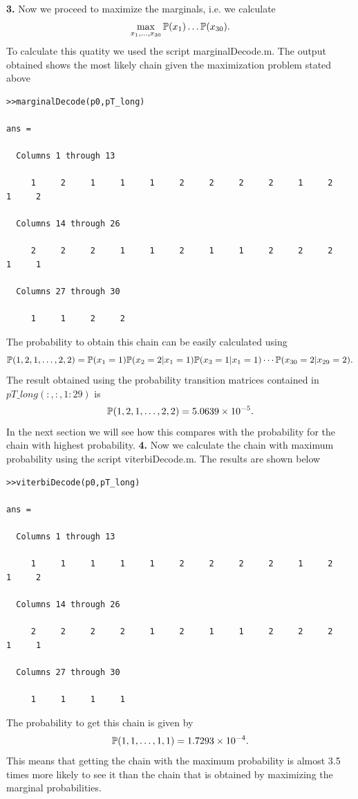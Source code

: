 \documentclass{article}
\begin{document}
\textbf{3.}
\newline
Now we proceed to maximize the marginals, i.e. we calculate
\begin{equation*}
\max_{x_{1},\ldots,x_{30}}\mathbb{P}(x_{1})\ldots\mathbb{P}(x_{30}).
\end{equation*} 
To calculate this quatity we used the script marginalDecode.m. The output obtained shows the most likely chain given the maximization problem stated above
\begin{verbatim}
>>marginalDecode(p0,pT_long)

ans =

  Columns 1 through 13

     1     2     1     1     1     2     2     2     2     1     2     1     2

  Columns 14 through 26

     2     2     2     1     1     2     1     1     2     2     2     1     1

  Columns 27 through 30

     1     1     2     2
\end{verbatim}
The probability to obtain this chain can be easily calculated using 
\begin{equation*}
\mathbb{P}(1,2,1,\ldots,2,2)=\mathbb{P}(x_{1}=1)\mathbb{P}(x_{2}=2|x_{1}=1)\mathbb{P}(x_{3}=1|x_{1}=1)\cdots\mathbb{P}(x_{30}=2|x_{29}=2).
\end{equation*}
The result obtained using the probability transition matrices contained in $pT\_long(:,:,1:29)$ is
\begin{equation*}
\mathbb{P}(1,2,1,\ldots,2,2)=5.0639\times 10^{-5}.
\end{equation*}
In the next section we will see how this compares with the probability for the chain with highest probability.
\newline
\textbf{4.}
\newline
Now we calculate the chain with maximum probability using the script viterbiDecode.m. The results are shown below

\begin{verbatim}
>>viterbiDecode(p0,pT_long)  

ans =

  Columns 1 through 13

     1     1     1     1     1     2     2     2     2     1     2     1     2

  Columns 14 through 26

     2     2     2     2     1     2     1     1     2     2     2     1     1

  Columns 27 through 30

     1     1     1     1
\end{verbatim}
The probability to get this chain is given by
\begin{equation*}
\mathbb{P}(1,1,\ldots,1,1)=1.7293\times 10^{-4}.
\end{equation*}
This means that getting the chain with the maximum probability is almost 3.5 times more likely to see it than the chain that is obtained
by maximizing the marginal probabilities.
\end{document}
